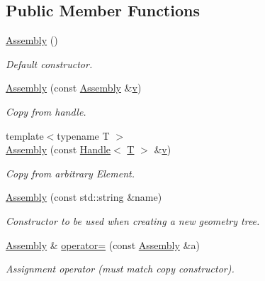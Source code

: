 \subsection*{Public Member Functions}
\begin{DoxyCompactItemize}
\item 
\hyperlink{class_d_d4hep_1_1_geometry_1_1_assembly_a18347f291bd562b3ef99fe05f043b03c}{Assembly} ()
\begin{DoxyCompactList}\small\item\em Default constructor. \item\end{DoxyCompactList}\item 
\hyperlink{class_d_d4hep_1_1_geometry_1_1_assembly_a8eb0042bd057b80ad9e4e3e716de4399}{Assembly} (const \hyperlink{class_d_d4hep_1_1_geometry_1_1_assembly}{Assembly} \&\hyperlink{_multi_view_8cpp_a8320ee13ac034dbf6d624fe8953dd337}{v})
\begin{DoxyCompactList}\small\item\em Copy from handle. \item\end{DoxyCompactList}\item 
{\footnotesize template$<$typename T $>$ }\\\hyperlink{class_d_d4hep_1_1_geometry_1_1_assembly_a64239140e1f478d5a549b35cc9eb54df}{Assembly} (const \hyperlink{class_d_d4hep_1_1_handle}{Handle}$<$ \hyperlink{class_t}{T} $>$ \&\hyperlink{_multi_view_8cpp_a8320ee13ac034dbf6d624fe8953dd337}{v})
\begin{DoxyCompactList}\small\item\em Copy from arbitrary Element. \item\end{DoxyCompactList}\item 
\hyperlink{class_d_d4hep_1_1_geometry_1_1_assembly_a6fd0a7388bc3477c3de4befc6c2cafa4}{Assembly} (const std::string \&name)
\begin{DoxyCompactList}\small\item\em Constructor to be used when creating a new geometry tree. \item\end{DoxyCompactList}\item 
\hyperlink{class_d_d4hep_1_1_geometry_1_1_assembly}{Assembly} \& \hyperlink{class_d_d4hep_1_1_geometry_1_1_assembly_a49d6772ff3ef1ed2a49a27ce35caaaac}{operator=} (const \hyperlink{class_d_d4hep_1_1_geometry_1_1_assembly}{Assembly} \&a)
\begin{DoxyCompactList}\small\item\em Assignment operator (must match copy constructor). \item\end{DoxyCompactList}\end{DoxyCompactItemize}


